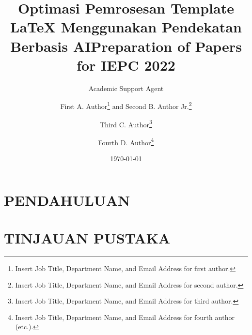 \documentclass{new-aiaa}
\title{Optimasi Pemrosesan Template LaTeX Menggunakan Pendekatan Berbasis AI}
\author{Academic Support Agent}
\date{\today}
\begin{document}
\maketitle

\begin{abstract}

\end{abstract}

\chapter{PENDAHULUAN}


\chapter{TINJAUAN PUSTAKA}


\usepackage[utf8]{inputenc}
\usepackage{iepc2022}

\usepackage{amsmath}
\usepackage{graphicx}
\usepackage[version=4]{mhchem}
\usepackage{siunitx}
\usepackage{longtable,tabularx}
\setlength\LTleft{0pt}


\title{Preparation of Papers for IEPC 2022}

\author{First A. Author\footnote{Insert Job Title, Department Name, and Email Address for first author.} and Second B. Author Jr.\footnote{Insert Job Title, Department Name, and Email Address for second author.}}
\author{Third C. Author\footnote{Insert Job Title, Department Name, and Email Address for third author.}}
\author{Fourth D. Author\footnote{Insert Job Title, Department Name, and Email Address for fourth author (etc.).}}
\end{document}
